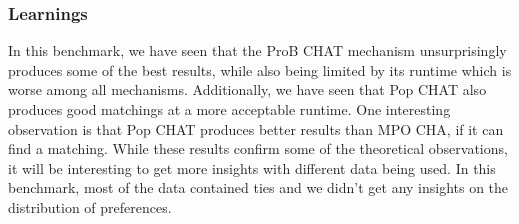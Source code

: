 \subsubsection{Learnings}
In this benchmark, we have seen that the ProB CHAT mechanism unsurprisingly produces some of the best results, while also being limited by its runtime which is worse among all mechanisms. Additionally, we have seen that Pop CHAT also produces good matchings at a more acceptable runtime. One interesting observation is that Pop CHAT produces better results than MPO CHA, if it can find a matching. While these results confirm some of the theoretical observations, it will be interesting to get more insights with different data being used. In this benchmark, most of the data contained ties and we didn't get any insights on the distribution of preferences. 